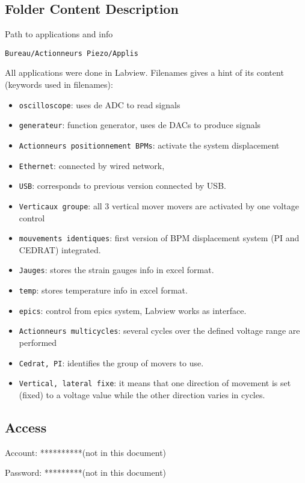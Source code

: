 \subsection{Folder Content Description}\par
Path to applications and info\par
\verb?Bureau/Actionneurs Piezo/Applis?\par
All applications were done in Labview. Filenames gives a hint of its content (keywords used in filenames):\par
\begin{itemize}
\item \verb?oscilloscope?: uses de ADC to read signals
\item \verb?generateur?: function generator, uses de DACs to produce signals
\item \verb?Actionneurs positionnement BPMs?: activate the system displacement
\item \verb?Ethernet?: connected by wired network,
\item \verb?USB?: corresponds to previous version connected by USB.
\item \verb?Verticaux groupe?: all 3 vertical mover movers are activated by one voltage control
\item \verb?mouvements identiques?: first version of BPM displacement system (PI and CEDRAT) integrated.
\item \verb?Jauges?: stores the strain gauges info in excel format.
\item \verb?temp?: stores temperature info in excel format.
\item \verb?epics?: control from epics system, Labview works as interface.
\item \verb?Actionneurs multicycles?: several cycles over the defined voltage range are performed
\item \verb?Cedrat, PI?: identifies the group of movers to use.
\item \verb?Vertical, lateral fixe?: it means that one direction of movement is set (fixed) to a voltage value while the other direction varies in cycles.
\end{itemize}

\subsection{Access}
Account: **********(not in this document)\par
Password: *********(not in this document)\par

